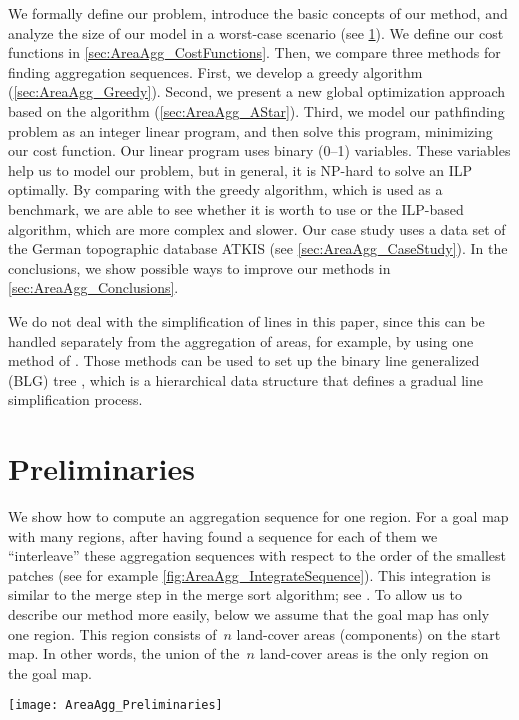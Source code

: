 \documentclass[acmsmall,natbib=false]{acmart}
\begin{document}

We formally define our problem, 
introduce the basic concepts of our method, 
and analyze the size of our model in a worst-case scenario
(see \sect\ref{sec:AreaAgg_Preliminaries}).
We define our cost functions in 
\sect\ref{sec:AreaAgg_CostFunctions}.
Then, we compare three methods for finding aggregation sequences.
First, we develop 
a greedy algorithm (\sect\ref{sec:AreaAgg_Greedy}).
Second, we present a new global optimization approach
based on the \Astar algorithm 
(\sect\ref{sec:AreaAgg_AStar}).
Third, we model our pathfinding problem as
an integer linear program, 
and then solve this program, minimizing our cost function.
Our linear program uses binary (0--1) variables. 
These variables help us to model our problem, 
but in general, it is NP-hard to solve an ILP optimally.
By comparing with the greedy algorithm, 
which is used as a benchmark,
we are able to see whether it is worth 
to use \Astar or the ILP-based algorithm, 
which are more complex and slower.  
Our case study 
uses a data set of the German topographic database ATKIS 
(see \sect\ref{sec:AreaAgg_CaseStudy}).
In the conclusions, we show possible ways to improve our 
methods in \sect\ref{sec:AreaAgg_Conclusions}. 

We do not deal with the simplification of lines in this paper, 
since this can be handled separately from the
aggregation of areas, for example, 
by using one method of 
\textcite{Douglas1973,Saalfeld1999,Wu2004DP}.
Those methods can be used to set up 
the binary line generalized (BLG) tree
\citep{vanOosterom1995Development},
which is a hierarchical data structure that 
defines a gradual line simplification process.



\section{Preliminaries}
\label{sec:AreaAgg_Preliminaries}

We show how to compute an aggregation sequence for one region. 
For a goal map with many regions, 
after having found a sequence for each of them
we ``interleave'' these aggregation sequences
with respect to the order of the smallest patches 
(see for example \fig\ref{fig:AreaAgg_IntegrateSequence}).
This integration is similar to the merge step in the 
merge sort algorithm; 
see \textcite[pp.~29--37]{Cormen2009}.
To allow us to describe our method more easily,
below we assume that the goal map has only one region.
This region consists of~$n$ land-cover 
areas (components) on the start map. 
In other words, the union of the~$n$ land-cover areas 
is the only region on the goal map.
\begin{figure*}[tb]
\centering
\texttt{[image: AreaAgg\_Preliminaries]}
\caption{Integrating two aggregation sequences 
	of different regions: 
	the resulting sequence contains the given sequences 
	as subsequences and 
	always takes the subdivision with smallest patch next.
	The gray arrows show the integration of the two regions.
}
\label{fig:AreaAgg_IntegrateSequence}
\end{figure*}
\end{document}

